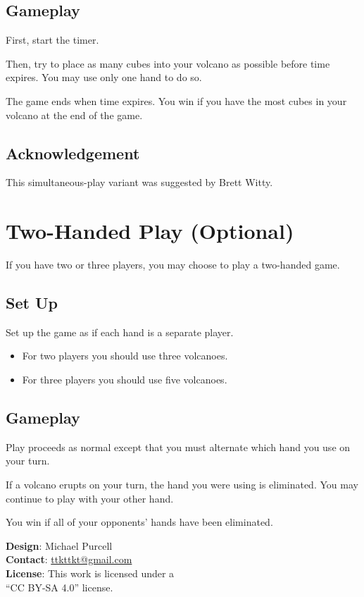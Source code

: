 \documentclass[parskip=half]{scrartcl}
\begin{document}
\subsection*{Gameplay}
First, start the timer. 

Then, try to place as many cubes into your volcano as possible before time expires. You may use only one hand to do so.


The game ends when time expires. You win if you have the most cubes in your volcano at the end of the game.  

\subsection*{Acknowledgement}
This simultaneous-play variant was suggested by Brett Witty.

\newpage

\section*{Two-Handed Play (Optional)}
If you have two or three players, you may choose to play a two-handed game.

\subsection*{Set Up}
Set up the game as if each hand is a separate player. 

\begin{itemize}[leftmargin=*]
\item For two players you should use three volcanoes.
\item For three players you should use five volcanoes.
\end{itemize}

\subsection*{Gameplay}
Play proceeds as normal except that you must alternate which hand you use on your turn.

If a volcano erupts on your turn, the hand you were using is eliminated. You may continue to play with your other hand.

You win if all of your opponents' hands have been eliminated.

\vfill

\scriptsize
\textbf{Design}: Michael Purcell\\
\textbf{Contact}: \href{mailto:ttkttkt@gmail.com}{ttkttkt@gmail.com}\\
\textbf{License}: This work is licensed under a\\``CC BY-SA 4.0'' license.%
\end{document}
